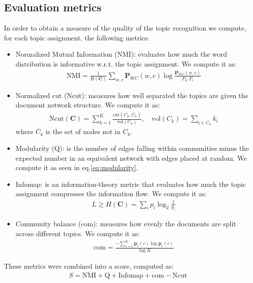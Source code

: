 \documentclass[conference]{IEEEtran}
\begin{document}
\subsection{Evaluation metrics}

In order to obtain a measure of the quality of the topic recognition we compute, for each topic assignment, the following metrics:

\begin{itemize}
    \item Normalized Mutual Information (NMI): evaluates how much the word distribution is informative w.r.t. the topic assignment. We compute it as:
    \begin{align*}
        \text{NMI} = \frac{1}{H(\mathbf{C})} \sum_{w, c} \mathbf{P}_{WC}(w,c) \log\frac{\mathbf{P}_{WC}(w,c)}{P_w \: P_c}
    \end{align*}
    \item Normalized cut (Ncut): measures how well separated the topics are given the document network structure. We compute it as:
    \begin{align*}
        \text{Ncut}(\mathbf{C}) = \sum_{k=1}^{K} \frac{\text{cut}(C_k, \overline{C}_k)}{\text{vol}(C_k)}, \quad 
        \text{vol}(C_k) = \sum_{i \in C_k} k_i
    \end{align*}
    where $\overline{C}_k$ is the set of nodes not in $C_k$.
    \item Modularity (Q): is the number of edges falling within communities minus the expected number in an equivalent network with edges placed at random. We compute it as seen in eq.\eqref{eq:modularity}.
    \item Infomap: is an information-theory metric that evaluates how much the topic assignment compresses the information flow. We compute it as:
    \begin{align*}
        L \gtrsim H(\mathbf{C}) = \sum_i p_i \log_2 \frac{1}{p_i}
    \end{align*}
    \item Community balance (com): measures how evenly the documents are split across different topics. We compute it as:
    \begin{align*}
        \text{com} = \frac{- \sum_{c=1}^{K} \mathbf{p}_c(c) \log \mathbf{p}_c(c)}{\log K}
    \end{align*}
\end{itemize}
These metrics were combined into a score, computed as:
\begin{align*}
    S = \text{NMI} + \text{Q} + \text{Infomap} + \text{com} - \text{Ncut}
\end{align*}
\end{document}
